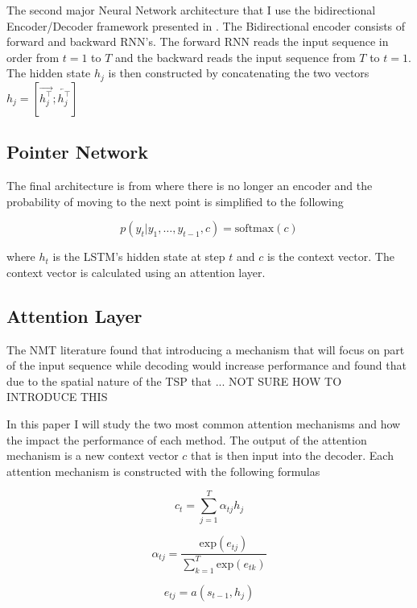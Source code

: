 \documentclass[12pt]{article}
\begin{document}
The second major Neural Network architecture that I use the bidirectional Encoder/Decoder framework presented in \citet{2014_bah}. The Bidirectional encoder consists of forward and backward RNN's. The forward RNN reads the input sequence in order from $t=1$ to $T$ and the backward reads the input sequence from $T$ to $t=1$. The hidden state $h_j$ is then constructed by concatenating the two vectors $h_j=[\overrightarrow{h_j^\top};\overleftarrow{h_j^\top}]$

\subsection{Pointer Network}

The final architecture is from \citet{2015_Vinyals} where there is no longer an encoder and the probability of moving to the next point is simplified to the following

\begin{equation*}
  p(y_t|y_1,\dots,y_{t-1}, c)=\text{softmax}(c)
\end{equation*}

where $h_t$ is the LSTM's hidden state at step $t$ and $c$ is the context vector. The context vector is calculated using an attention layer.

\subsection{Attention Layer}

The NMT literature found that introducing a mechanism that will focus on part of the input sequence while decoding would increase performance and \citet{2015_Vinyals} found that due to the spatial nature of the TSP that ... NOT SURE HOW TO INTRODUCE THIS

In this paper I will study the two most common attention mechanisms and how the impact the performance of each method. The output of the attention mechanism is a new context vector $c$ that is then input into the decoder. Each attention mechanism is constructed with the following formulas

\begin{equation*}
  c_t=\sum_{j=1}^T \alpha_{tj}h_j
\end{equation*}

\begin{equation*}
  \alpha_{tj}=\frac{\text{exp}(e_{tj})}{\sum_{k=1}^T\text{exp}(e_{tk})}
\end{equation*}

\begin{equation*}
  e_{tj}=a(s_{t-1},h_j)
\end{equation*}
\end{document}
